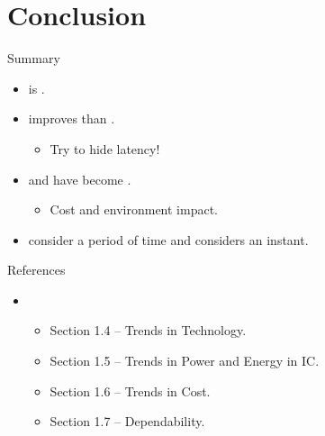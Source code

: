 \section{Conclusion}

\begin{frame}[t]{Summary}
\begin{itemize}
  \item {} is .

  \item {} improves  than .
    \begin{itemize}
      \item Try to hide latency!
    \end{itemize}

  \item {} and  have become .
    \begin{itemize}
      \item Cost and environment impact.
    \end{itemize}

  \item {} consider a period of time and  considers an instant.
\end{itemize}
\end{frame}

\begin{frame}[t]{References}
\begin{itemize}
  \item \credithennessy
    \begin{itemize}
      \item Section 1.4 -- Trends in Technology.
      \item Section 1.5 -- Trends in Power and Energy in IC.
      \item Section 1.6 -- Trends in Cost.
      \item Section 1.7 -- Dependability.
    \end{itemize}
\end{itemize}
\end{frame}
